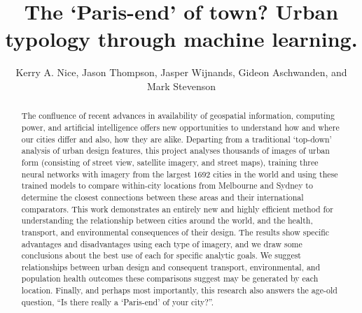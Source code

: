 \documentclass[sageh,times]{sagej}
\begin{document}
%
%


\title{The `Paris-end' of town? Urban typology through machine learning.}

\author{Kerry A. Nice, Jason Thompson, Jasper Wijnands, Gideon Aschwanden, and Mark Stevenson}






\begin{abstract}

The confluence of recent advances in availability of geospatial information, computing power, and artificial intelligence offers new opportunities to understand how and where our cities differ and also, how they are alike. Departing from a traditional `top-down' analysis of urban design features, this project analyses thousands of images of urban form (consisting of street view, satellite imagery, and street maps), training three neural networks with imagery from the largest 1692 cities in the world and using these trained models to compare within-city locations from Melbourne and Sydney to determine the closest connections between these areas and their international comparators. This work demonstrates an entirely new and highly efficient method for understanding the relationship between cities around the world, and the health, transport, and environmental consequences of their design. The results show specific advantages and disadvantages using each type of imagery, and we draw some conclusions about the best use of each for specific analytic goals. We suggest relationships between urban design and consequent transport, environmental, and population health outcomes these comparisons suggest may be generated by each location. Finally, and perhaps most importantly, this research also answers the age-old question, ``Is there really a `Paris-end' of your city?''.
\end{abstract}
\end{document}
